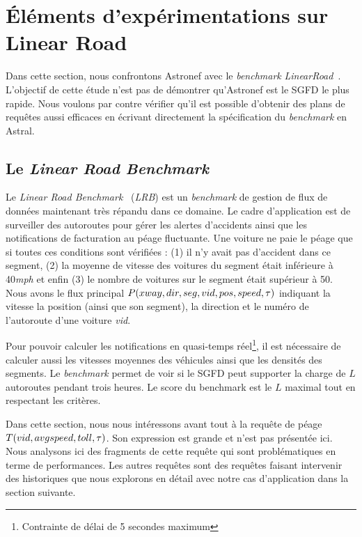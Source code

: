 \section{Éléments d'expérimentations sur Linear Road}\label{sec:valid:perfs:flux}
Dans cette section, nous confrontons Astronef avec le \textit{benchmark} \textit{LinearRoad}~\cite{Arasu:lrb}. L'objectif de cette étude n'est pas de démontrer qu'Astronef est le SGFD le plus rapide. Nous voulons par contre vérifier qu'il est possible d'obtenir des plans de requêtes aussi efficaces en écrivant directement la spécification du \textit{benchmark} en Astral.

\subsection{Le \textit{Linear Road Benchmark}}
Le \textit{Linear Road Benchmark}~\cite{Arasu:lrb} (\textit{LRB}) est un \textit{benchmark} de gestion de flux de données maintenant très répandu dans ce domaine. Le cadre d'application est de surveiller des autoroutes pour gérer les alertes d'accidents ainsi que les notifications de facturation au péage fluctuante. Une voiture ne paie le péage que si toutes ces conditions sont vérifiées : (1) il n'y avait pas d'accident dans ce segment, (2) la moyenne de vitesse des voitures du segment était inférieure à 40\textit{mph} et enfin (3) le nombre de voitures sur le segment était supérieur à 50. Nous avons le flux principal $P(xway, dir, seg, vid, pos, speed, \tau)$ indiquant la vitesse la position (ainsi que son segment), la direction et le numéro de l'autoroute d'une voiture \textit{vid}.

Pour pouvoir calculer les notifications en quasi-temps réel\footnote{Contrainte de délai de 5 secondes maximum}, il est nécessaire de calculer aussi les vitesses moyennes des véhicules ainsi que les densités des segments. Le \textit{benchmark} permet de voir si le SGFD peut supporter la charge de $L$ autoroutes pendant trois heures. Le score du benchmark est le $L$ maximal tout en respectant les critères.

Dans cette section, nous nous intéressons avant tout à la requête de péage $T(vid,avgspeed,toll,\tau)$. Son expression est grande et n'est pas présentée ici. Nous analysons ici des fragments de cette requête qui sont problématiques en terme de performances. Les autres requêtes sont des requêtes faisant intervenir des historiques que nous explorons en détail avec notre cas d'application dans la section suivante.

